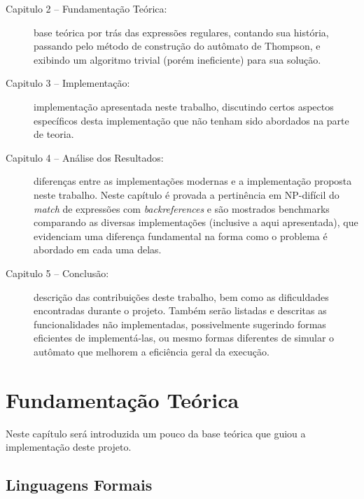 \documentclass[a4paper,12pt,oneside,onecolumn]{uerj}
\begin{document}
\begin{description}

\item[Capitulo 2 -- Fundamentação Teórica:] base teórica por trás das expressões regulares, contando sua história, passando pelo método de construção do autômato de Thompson, e exibindo um algoritmo trivial (porém ineficiente) para sua solução.

\item[Capitulo 3 -- Implementação:] implementação apresentada neste trabalho, discutindo certos aspectos específicos desta implementação que não tenham sido abordados na parte de teoria. 

\item[Capitulo 4 -- Análise dos Resultados:] diferenças entre as implementações modernas e a implementação proposta neste trabalho. Neste capítulo é provada a pertinência em NP-difícil do \emph{match} de expressões com \emph{backreferences} e são mostrados benchmarks comparando as diversas implementações (inclusive a aqui apresentada), que evidenciam uma diferença fundamental na forma como o problema é abordado em cada uma delas. 

\item[Capitulo 5 -- Conclusão:] descrição das contribuições deste trabalho, bem como as dificuldades encontradas durante o projeto. Também serão listadas e descritas as funcionalidades não implementadas, possivelmente sugerindo formas eficientes de implementá-las, ou mesmo formas diferentes de simular o autômato que melhorem a eficiência geral da execução. 

\end{description}

\chapter{Fundamentação Teórica}\label{cap:theory}

Neste capítulo será introduzida um pouco da base teórica que guiou a implementação deste projeto.

\section{Linguagens Formais}
\end{document}
